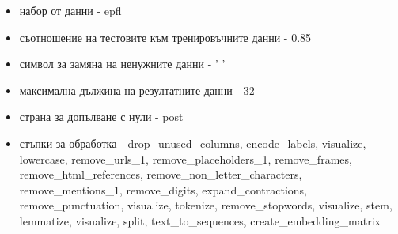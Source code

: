 \documentclass{article}
\begin{document}
\begin{itemize}
\begin{itemize}
\item набор от данни - epfl
\item съотношение на тестовите към тренировъчните данни - 0.85
\item символ за замяна на ненужните данни - ' '
\item максимална дължина на резултатните данни - 32
\item страна за допълване с нули - post
\item стъпки за обработка - drop\_unused\_columns, encode\_labels, visualize, lowercase, remove\_urls\_1,
remove\_placeholders\_1, remove\_frames, remove\_html\_references, remove\_non\_letter\_characters,
remove\_mentions\_1, remove\_digits, expand\_contractions, remove\_punctuation, visualize, tokenize,
remove\_stopwords, visualize, stem, lemmatize, visualize, split, text\_to\_sequences, create\_embedding\_matrix
\end{itemize}


\end{itemize}
\end{document}

